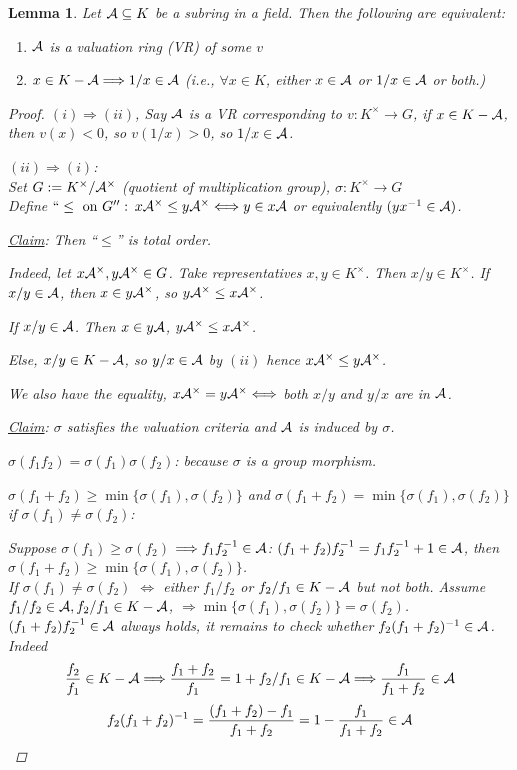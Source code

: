 \documentclass[11pt]{article}
\newtheorem{lemma}[thm]{Lemma}
\newcommand{\cala}{{\cal A}}
\newcommand{\Lrta}{\Longrightarrow}
\newcommand{\lrta}{\longrightarrow}
\newcommand{\Llrta}{\Longleftrightarrow}
\begin{document}
\begin{lemma}\label{lem:equiv_defs_VR}
Let $\cala\subseteq K$ be a subring in a field. Then the following are equivalent:
\begin{enumerate}[label=(\roman*)]
\item $\cala$ is a valuation ring (VR) of some $v$
\item $x\in K-\cala\Lrta 1/x\in \cala$ (i.e., $\forall x\in K$, either $x\in \cala$ or $1/x\in \cala$ or both.)
\end{enumerate}
\begin{proof}
$(i)\Lrta (ii)$, Say $\cala$ is a VR
 corresponding to $v:K^\times\lrta G$, if $x\in K-\cala$, then $v(x)< 0$, so $v(1/x)>0$, so $1/x\in \cala$. 

 $(ii)\Lrta (i)$:\\
Set $G:=K^\times/\cala^\times$ (quotient of multiplication group), 
$\sigma:K^\times\lrta G$\\
Define $``\leq \text{ on }G'':$
$x\cala^\times\leq y\cala^\times\Llrta y\in x\cala$ or equivalently $(y x^{-1}\in\cala)$.

\underline{Claim}: Then ``$\leq $'' is total order. 

Indeed, let $x\cala^\times, y\cala^\times\in G$. Take representatives $x,y\in K^\times$. Then $x/y\in K^\times$. If $x/y\in \cala$, then $x\in y\cala^\times$, so $y \cala^\times\leq x \cala^\times$.

If $x/y\in\cala$. Then $x\in y\cala$, $y\cala^\times\leq x\cala^\times$.

Else, $x/y\in K-\cala$, so $y/x\in\cala$ by $(ii)$ hence $x\cala^\times\leq y\cala^\times$.

We also have the equality, $x\cala^\times=y\cala^\times\Llrta $ both $x/y$ and $y/x$ are in $\cala$.

\underline{Claim}: $\sigma$ satisfies the valuation criteria and $\cala$ is induced by $\sigma$.

$\sigma(f_1f_2)=\sigma(f_1)\sigma(f_2)$: because $\sigma$ is a group morphism.

$\sigma(f_1+f_2)\geq \min\{\sigma(f_1),\sigma(f_2)\}$ and $\sigma(f_1+f_2)=\min\{\sigma(f_1),\sigma(f_2)\}$ if $\sigma(f_1)\neq \sigma(f_2)$: 

Suppose $\sigma(f_1)\geq \sigma(f_2)$ $\Lrta f_1 f_2^{-1}\in\cala$: $(f_1+f_2)f_2^{-1}=f_1f_2^{-1}+1\in\cala$, then $\sigma(f_1+f_2)\geq \min\{\sigma(f_1),\sigma(f_2)\}$.\\
If $\sigma(f_1)\neq \sigma(f_2)$ $\Llrta$ either $f_1/f_2$ or $f_2/f_1\in K-\cala$ but not both. Assume $f_1/f_2\in\cala, f_2/f_1\in K-\cala$, $\Lrta \min\{\sigma(f_1),\sigma(f_2)\}=\sigma(f_2)$. $(f_1+f_2)f_2^{-1}\in\cala$ always holds, it remains to check whether $f_2(f_1+f_2)^{-1}\in \cala$.
Indeed
$$
\frac{f_2}{f_1}\in K-\cala\Lrta \frac{f_1+f_2}{f_1}=1+f_2/f_1\in K-\cala\Lrta  \frac{f_1}{f_1+f_2}\in\cala
$$
$$
f_2(f_1+f_2)^{-1}=\frac{(f_1+f_2)-f_1}{f_1+f_2}=1-\frac{f_1}{f_1+f_2}\in\cala
$$ 


\end{proof}
\end{lemma}
\end{document}
